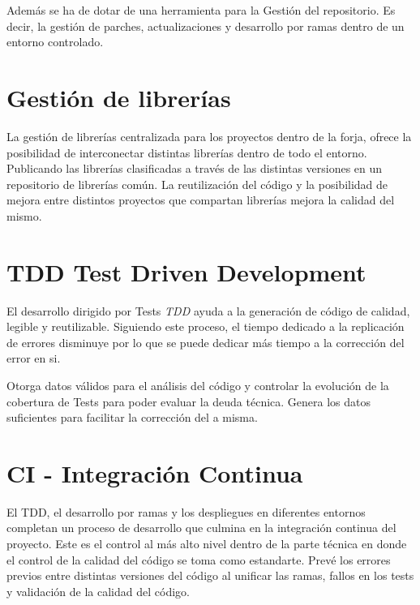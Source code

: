 \par Además se ha de dotar de una herramienta para la Gesti\'on del repositorio. Es decir, la gestión de parches, actualizaciones y desarrollo por ramas dentro de un entorno controlado.


\section{Gestión de librerías}
\label{sec:gestion-librerias}

\par La gesti\'on de librer\'ias centralizada para los proyectos dentro de la forja, ofrece la posibilidad de interconectar distintas librerías dentro de todo el entorno. Publicando las librerías clasificadas a través de las distintas versiones en un repositorio de librerías común. La reutilización del código y la posibilidad de mejora entre distintos proyectos que compartan librerías mejora la calidad del mismo.


\section{TDD Test Driven Development}
\label{sec:tdd}

\par El desarrollo dirigido por Tests \emph{TDD} ayuda a la generación de código de calidad, legible y reutilizable. Siguiendo este proceso, el tiempo dedicado a la replicación de errores disminuye por lo que se puede dedicar más tiempo a la corrección del error en si.

\par Otorga datos válidos para el análisis del código y controlar la evolución de la cobertura de Tests para poder evaluar la deuda técnica. Genera los datos suficientes para facilitar la corrección del a misma.


\section{CI - Integración Continua}
\label{sec:integracion-continua}

\par El TDD, el desarrollo por ramas y los despliegues en diferentes entornos completan un proceso de desarrollo que culmina en la integración continua del proyecto. Este es el control al más alto nivel dentro de la parte técnica en donde el control de la calidad del código se toma como estandarte. Prevé los errores previos entre distintas versiones del código al unificar las ramas, fallos en los tests y validación de la calidad del código.


